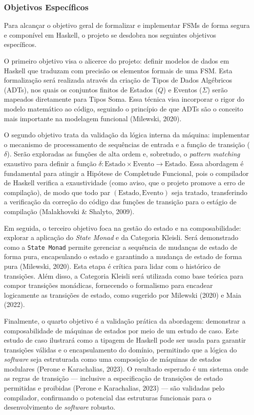 \documentclass[12pt,a4paper]{article}
\begin{document}
\subsubsection{Objetivos Específicos}

Para alcançar o objetivo geral de formalizar e implementar FSMs de forma segura e componível em Haskell, o projeto se desdobra nos seguintes objetivos específicos.

O primeiro objetivo visa o alicerce do projeto: definir modelos de dados em Haskell que traduzam com precisão os elementos formais de uma FSM. Esta formalização será realizada através da criação de Tipos de Dados Algébricos (ADTs), nos quais os conjuntos finitos de Estados ($Q$) e Eventos ($\Sigma$) serão mapeados diretamente para Tipos Soma. Essa técnica visa incorporar o rigor do modelo matemático ao código, seguindo o princípio de que ADTs são o conceito mais importante na modelagem funcional (Milewski, 2020).

O segundo objetivo trata da validação da lógica interna da máquina: implementar o mecanismo de processamento de sequências de entrada e a função de transição ($\delta$). Serão exploradas as funções de alta ordem e, sobretudo, o \textit{pattern matching} exaustivo para definir a função $\delta: \text{Estado} \times \text{Evento} \to \text{Estado}$. Essa abordagem é fundamental para atingir a Hipótese de Completude Funcional, pois o compilador de Haskell verifica a exaustividade (como aviso, que o projeto promove a erro de compilação), de modo que todo par $(\text{Estado}, \text{Evento})$ seja tratado, transferindo a verificação da correção do código das funções de transição para o estágio de compilação (Malakhovski \& Shalyto, 2009).

Em seguida, o terceiro objetivo foca na gestão do estado e na composabilidade: explorar a aplicação do \textit{State Monad} e da Categoria Kleisli. Será demonstrado como a \texttt{State Monad} permite gerenciar a sequência de mudanças de estado de forma pura, encapsulando o estado e garantindo a mudança de estado de forma pura (Milewski, 2020). Esta etapa é crítica para lidar com o histórico de transições. Além disso, a Categoria Kleisli será utilizada como base teórica para compor transições monádicas, fornecendo o formalismo para encadear logicamente as transições de estado, como sugerido por Milewski (2020) e Maia (2022).

Finalmente, o quarto objetivo é a validação prática da abordagem: demonstrar a composabilidade de máquinas de estados por meio de um estudo de caso. Este estudo de caso ilustrará como a tipagem de Haskell pode ser usada para garantir transições válidas e o encapsulamento do domínio, permitindo que a lógica do \textit{software} seja estruturada como uma composição de máquinas de estados modulares (Perone e Karachalias, 2023). O resultado esperado é um sistema onde as regras de transição --- inclusive a especificação de transições de estado permitidas e proibidas (Perone e Karachalias, 2023) --- são validadas pelo compilador, confirmando o potencial das estruturas funcionais para o desenvolvimento de \textit{software} robusto.
\end{document}
